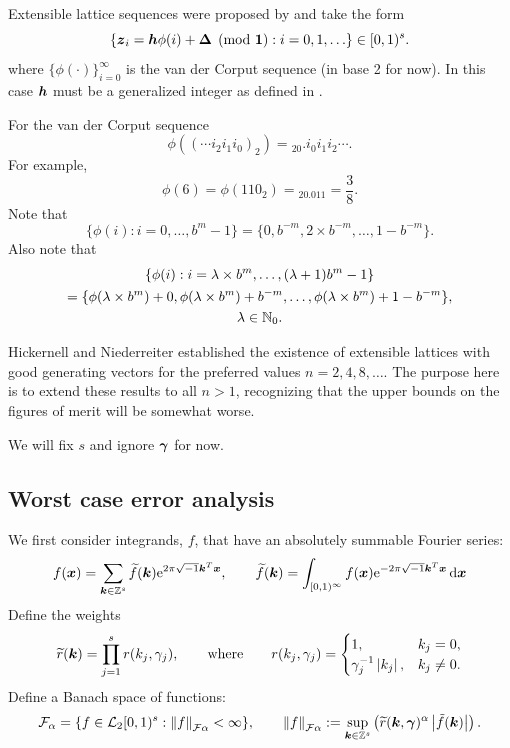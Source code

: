 \documentclass{amsart}
\newcommand{\tr}{\widetilde{r}}
\begin{document}
Extensible lattice sequences were proposed by \cite{HicEtal00,Mai81a} and take the form
\begin{equation} \label{eq:extlat}
    \{\boldsymbol{z}_i = \boldsymbol{h}\phi(i)+ \boldsymbol{\Delta} \pmod{\boldsymbol{1}} : i=0,1, \ldots \} \in [0,1)^s.
\end{equation}
where $\{\phi(\cdot)\}_{i=0}^\infty$ is the van der Corput sequence (in base 2 for now).  In this case $\boldsymbol{h}$ must be a generalized integer as defined in \cite[Section 2]{HicNie03a}.

For the van der Corput sequence
\[
\phi((\cdots i_2 i_1 i_0)_2) = {}_20.i_0 i_1 i_2 \cdots.
\]
For example,
\[
\phi(6) = \phi(110_2) = {}_20.011 = \frac 38.
\]
Note that
\begin{equation} \label{eq:phipropone}
\{ \phi(i) : i = 0, \ldots, b^m-1 \} = \{0, b^{-m}, 2\times b^{-m}, \ldots, 1 - b^{-m} \}.
\end{equation}
Also note that
\begin{multline} \label{eq:phiproptwo}
\{ \phi(i) : i = \lambda \times b^m , \ldots, (\lambda+1)b^m-1 \} \\
= \{\phi(\lambda \times b^m) + 0, \phi(\lambda \times b^m) + b^{-m}, \ldots, \phi(\lambda \times b^m) + 1 - b^{-m} \} , \\
\lambda \in \mathbb{N}_{0}.
\end{multline}


Hickernell and Niederreiter \cite{HicNie03a} established the existence of extensible lattices with good generating vectors for the preferred values $n = 2, 4, 8, \ldots$.  The purpose here is to extend these results to all $n>1$, recognizing that the upper bounds on the figures of merit will be somewhat worse.

We will fix $s$ and ignore $\boldsymbol{\gamma}$ for now.

\subsection{Worst case error analysis}
We first consider integrands, $f$, that have an absolutely summable Fourier series:
\begin{equation} \label{eq:fseries}
    f(\boldsymbol{x}) = \sum_{\boldsymbol{k} \in \mathbb{Z}^{s}} \widetilde{f}(\boldsymbol{k}) \mathrm{e}^{2 \pi \sqrt{-1} \boldsymbol{k}^T \boldsymbol{x}}, \qquad \widetilde{f}(\boldsymbol{k}) = \int_{[0,1)^{\infty}} f(\boldsymbol{x}) \mathrm{e}^{-2 \pi \sqrt{-1} \boldsymbol{k}^T \boldsymbol{x}}\, {\rm d} \boldsymbol{x}
\end{equation}
Define the weights
\begin{equation}
\tr(\vk) = \prod_{j=1}^{s} r(k_{j},\gamma_{j}),
\qquad \text{where} \qquad r(k_{j},\gamma_{j})=\begin{cases} 1, &
k_{j}=0, \\ \gamma_{j}^{-1}\abs{k_{j}}, & k_{j} \ne 0.  \end{cases}
\end{equation}
Define a Banach
space of functions:
$$
\cf_{\alpha} = \{ f \in \cl_2[0,1)^{s} :
\norm[\cf{\alpha}]{f} < \infty \}, \qquad
\norm[\cf{\alpha}]{f} := \sup_{\vk \in \integers^{s}}
\left(\tr(\vk,\vgamma)^{\alpha} \abs{\tilde{f}(\vk)} \right).
$$
\end{document}
